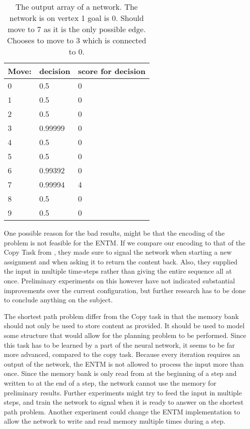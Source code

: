 \begin{table}[H]
	\centering
	\begin{tabular}{|l|l|l|}
		\hline
		Move:&	decision & score for decision\\\hline
		0&	0.5 & 0 \\\hline
		1&	0.5	& 0\\\hline
		2&	0.5	& 0\\\hline
		3&	0.99999 & 0\\\hline
		4&	0.5	& 0\\\hline
		5&	0.5	& 0\\\hline
		6&	0.99392 & 0\\\hline
		7&	0.99994 & 4\\\hline
		8&	0.5 & 0	\\\hline
		9&	0.5 & 0\\\hline
	\end{tabular}
	\caption{The output array of a network. The network is on vertex 1 goal is 0. Should move to 7 as it is the only possible edge. Chooses to move to 3 which is connected to 0.}
	\label{table:analysis:1}
\end{table}

\newpar One possible reason for the bad results, might be that the encoding of the problem is not feasible for the ENTM. If we compare our encoding to that of the Copy Task from \cite{greve2016evolving}, they made sure to signal the network when starting a new assignment and when asking it to return the content back. Also, they supplied the input in multiple time-steps rather than giving the entire sequence all at once. Preliminary experiments on this however have not indicated substantial improvements over the current configuration, but further research has to be done to conclude anything on the subject.

\newpar The shortest path problem differ from the Copy task in that the memory bank should not only be used to store content as provided. It should be used to model some structure that would allow for the planning problem to be performed. Since this task has to be learned by a part of the neural network, it seems to be far more advanced, compared to the copy task.
Because every iteration requires an output of the network, the ENTM is not allowed to process the input more than once. Since the memory bank is only read from at the beginning of a step and written to at the end of a step, the network cannot use the memory for preliminary results. 
Further experiments might try to feed the input in multiple steps, and train the network to signal when it is ready to answer on the shortest path problem. Another experiment could change the ENTM implementation to allow the network to write and read memory multiple times during a step.